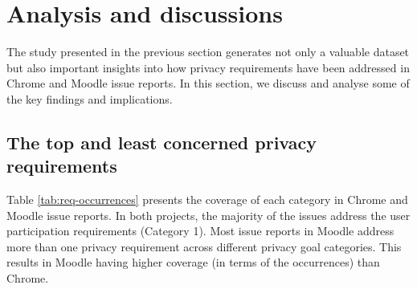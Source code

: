 \section{Analysis and discussions} \label{sec:results}

The study presented in the previous section generates not only a valuable dataset but also important insights into how privacy requirements have been addressed in Chrome and Moodle issue reports. In this section, we discuss and analyse some of the key findings and implications.


\subsection{The top and least concerned privacy requirements}

Table \ref{tab:req-occurrences} presents the coverage of each category in Chrome and Moodle issue reports.  In both projects, the majority of the issues address the user participation requirements (Category 1). Most issue reports in Moodle address more than one privacy requirement across different privacy goal categories. This results in Moodle having higher coverage (in terms of the occurrences) than Chrome. 

